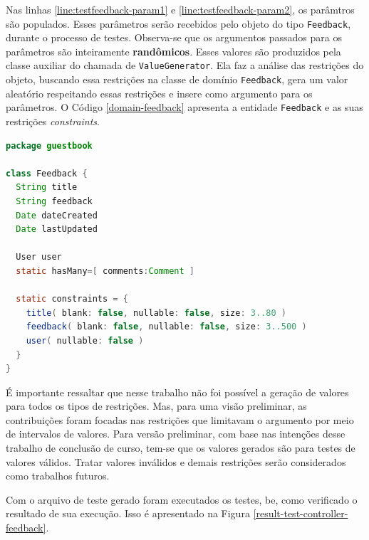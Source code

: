 Nas linhas \ref{line:testfeedback-param1} e \ref{line:testfeedback-param2},
os parâmtros são populados. Esses parâmetros serão recebidos pelo
objeto do tipo \lstinline|Feedback|, durante o processo de testes. Observa-se que os argumentos 
passados para os parâmetros são inteiramente \textbf{randômicos}.
Esses valores são produzidos pela classe auxiliar do \framework chamada
de \lstinline|ValueGenerator|. Ela faz a análise das restrições do objeto,
buscando essa restrições na classe de domínio \lstinline|Feedback|, gera
um valor aleatório respeitando essas restrições e insere como argumento
para os parâmetros. O Código \ref{domain-feedback} apresenta a entidade
\lstinline|Feedback| e as suas restrições \textit{constraints}.

\begin{lstlisting}[language=java, label=domain-feedback, caption=Arquivo de \lstinline|Feedback|]
package guestbook

class Feedback {
  String title
  String feedback
  Date dateCreated
  Date lastUpdated

  User user
  static hasMany=[ comments:Comment ]

  static constraints = {
    title( blank: false, nullable: false, size: 3..80 )
    feedback( blank: false, nullable: false, size: 3..500 )
    user( nullable: false )
  }
}

\end{lstlisting}

É importante ressaltar que nesse trabalho não foi possível a geração de valores
para todos os tipos de restrições. Mas, para uma visão preliminar, as contribuições foram focadas nas restrições que limitavam o argumento por meio de intervalos de valores. Para versão preliminar, com base nas intenções desse trabalho de conclusão de curso, tem-se que os valores
gerados são para testes de valores válidos. Tratar valores inválidos e demais
restrições serão considerados como trabalhos futuros.

Com o arquivo de teste gerado foram executados os testes, be, como verificado o resultado
de sua execução. Isso é apresentado na Figura \ref{result-test-controller-feedback}.

